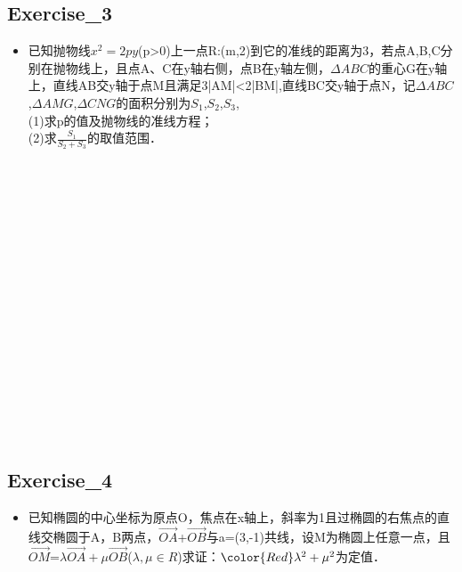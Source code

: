 \subsection{Exercise_3}
\begin{itemize}
\item 已知抛物线$x^2=2py$(p>0)上一点R:(m,2)到它的准线的距离为3，若点A,B,C分别在抛物线上，且点A、C在y轴右侧，点B在y轴左侧，$\Delta ABC$的重心G在y轴上，直线AB交y轴于点M且满足3|AM|<2|BM|,直线BC交y轴于点N，记$\Delta ABC$,$\Delta AMG$,$\Delta CNG$的面积分别为$S_1$,$S_2$,$S_3$,\\
(1)求p的值及抛物线的准线方程；\\
(2)求$\frac{S_1}{S_2+S_3}$的取值范围．\\
\end{itemize}
\\ \\ \\ \\ \\ \\ \\ \\ \\ \\ \\ \\ \\ \\ \\ \\
\subsection{Exercise_4}
\begin{itemize}
\item 已知椭圆的中心坐标为原点O，焦点在x轴上，斜率为1且过椭圆的右焦点的直线交椭圆于A，B两点，$\overrightarrow{OA}$+$\overrightarrow{OB}$与a=(3,-1)共线，设M为椭圆上任意一点，且$\overrightarrow{OM}$=$\lambda \overrightarrow{OA}+\mu \overrightarrow{OB}$($\lambda,\mu \in R$)求证：$\color{Red}\lambda^2+\mu^2$为定值．\\
\end{itemize}
\\ \\ \\ \\ \\ \\ \\ \\ \\ \\ \\ \\ \\ \\ \\ \\

